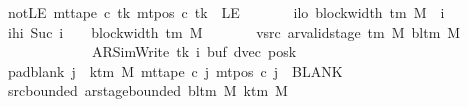\begin{isabellebody}
\ \ \ \ \ \ \ notLE{\isacharcolon}{\kern0pt}\ {\isachardoublequoteopen}mt{\isacharunderscore}{\kern0pt}tape\ c{\isacharprime}{\kern0pt}\ tk\ {\isacharparenleft}{\kern0pt}mt{\isacharunderscore}{\kern0pt}pos\ c{\isacharprime}{\kern0pt}\ tk{\isacharparenright}{\kern0pt}\ {\isasymnoteq}\ LE{}{\isachardoublequoteclose}\isanewline
\ \ \ \ \ \ \ ilo{\isacharcolon}{\kern0pt}\ {\isachardoublequoteopen}block{\isacharunderscore}{\kern0pt}width\ {\isacharparenleft}{\kern0pt}{\isasymGamma}{\isacharunderscore}{\kern0pt}tm\ M{\isacharparenright}{\kern0pt}\ {\isasymle}\ i{\isachardoublequoteclose}\isanewline
\ \ \ \ \ \ \ ihi{\isacharcolon}{\kern0pt}\ {\isachardoublequoteopen}Suc\ i\ {\isacharless}{\kern0pt}\ {}\ {\isacharasterisk}{\kern0pt}\ block{\isacharunderscore}{\kern0pt}width\ {\isacharparenleft}{\kern0pt}{\isasymGamma}{\isacharunderscore}{\kern0pt}tm\ M{\isacharparenright}{\kern0pt}{\isachardoublequoteclose}\isanewline
\ \ \ \ \ \ \ vsrc{\isacharcolon}{\kern0pt}\ {\isachardoublequoteopen}ar{\isacharunderscore}{\kern0pt}valid{\isacharunderscore}{\kern0pt}stage\ {\isacharparenleft}{\kern0pt}{\isasymGamma}{\isacharunderscore}{\kern0pt}tm\ M{\isacharparenright}{\kern0pt}\ {\isacharparenleft}{\kern0pt}bl{\isacharunderscore}{\kern0pt}tm\ M{\isacharparenright}{\kern0pt}\isanewline
\ \ \ \ \ \ \ \ \ \ \ \ \ \ \ \ \ \ \ {\isacharparenleft}{\kern0pt}AR{\isacharunderscore}{\kern0pt}SimWrite{\isacharcomma}{\kern0pt}\ tk{\isacharcomma}{\kern0pt}\ i{\isacharcomma}{\kern0pt}\ buf{\isacharcomma}{\kern0pt}\ dvec{\isacharcomma}{\kern0pt}\ posk{\isacharparenright}{\kern0pt}{\isachardoublequoteclose}\isanewline
\ \ \ \ \ \ \ pad{\isacharunderscore}{\kern0pt}blank{\isacharcolon}{\kern0pt}\ {\isachardoublequoteopen}{\isasymforall}j\ {\isasymge}\ k{\isacharunderscore}{\kern0pt}tm\ M{\isachardot}{\kern0pt}\ mt{\isacharunderscore}{\kern0pt}tape\ c{\isacharprime}{\kern0pt}\ j\ {\isacharparenleft}{\kern0pt}mt{\isacharunderscore}{\kern0pt}pos\ c{\isacharprime}{\kern0pt}\ j{\isacharparenright}{\kern0pt}\ {\isacharequal}{\kern0pt}\ BLANK{}{\isachardoublequoteclose}\isanewline
\ \ \ \ \ \ \ src{\isacharunderscore}{\kern0pt}bounded{\isacharcolon}{\kern0pt}\ {\isachardoublequoteopen}ar{\isacharunderscore}{\kern0pt}stage{\isacharunderscore}{\kern0pt}bounded\ {\isacharparenleft}{\kern0pt}bl{\isacharunderscore}{\kern0pt}tm\ M{\isacharparenright}{\kern0pt}\ {\isacharparenleft}{\kern0pt}k{\isacharunderscore}{\kern0pt}tm\ M{\isacharparenright}{\kern0pt}\isanewline

\end{isabellebody}
